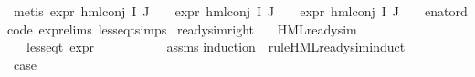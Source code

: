 \begin{isabellebody}
\ {\isacharparenleft}{\kern0pt}metis\ {\isacartoucheopen}expr{\isacharunderscore}{\kern0pt}{}\ {\isacharparenleft}{\kern0pt}hml{\isacharunderscore}{\kern0pt}conj\ I\ J\ {\isasymPhi}{\isacharparenright}{\kern0pt}\ {\isasymle}\ {}{\isacartoucheclose}\ {\isacartoucheopen}expr{\isacharunderscore}{\kern0pt}{}\ {\isacharparenleft}{\kern0pt}hml{\isacharunderscore}{\kern0pt}conj\ I\ J\ {\isasymPhi}{\isacharparenright}{\kern0pt}\ {\isasymle}\ {}{\isacartoucheclose}\ {\isacartoucheopen}expr{\isacharunderscore}{\kern0pt}{}\ {\isacharparenleft}{\kern0pt}hml{\isacharunderscore}{\kern0pt}conj\ I\ J\ {\isasymPhi}{\isacharparenright}{\kern0pt}\ {\isasymle}\ {}{\isacartoucheclose}\ enat{\isacharunderscore}{\kern0pt}ord{\isacharunderscore}{\kern0pt}code{\isacharparenleft}{\kern0pt}{}{\isacharparenright}{\kern0pt}\ expr{\isachardot}{\kern0pt}elims\ less{\isacharunderscore}{\kern0pt}eq{\isacharunderscore}{\kern0pt}t{\isachardot}{\kern0pt}simps{\isacharparenright}{\kern0pt}\isanewline
{}\isamarkupfalse%
%
\endisatagproof
{\isafoldproof}%
%
\isadelimproof
\isanewline
%
\endisadelimproof
\isanewline
{}\isamarkupfalse%
\ ready{\isacharunderscore}{\kern0pt}sim{\isacharunderscore}{\kern0pt}right{\isacharcolon}{\kern0pt}\isanewline
\ \ \ {\isachardoublequoteopen}HML{\isacharunderscore}{\kern0pt}ready{\isacharunderscore}{\kern0pt}sim\ {\isasymphi}{\isachardoublequoteclose}\isanewline
\ \ \ {\isachardoublequoteopen}less{\isacharunderscore}{\kern0pt}eq{\isacharunderscore}{\kern0pt}t\ {\isacharparenleft}{\kern0pt}expr\ {\isasymphi}{\isacharparenright}{\kern0pt}\ {\isacharparenleft}{\kern0pt}{\isasyminfinity}{\isacharcomma}{\kern0pt}\ {\isasyminfinity}{\isacharcomma}{\kern0pt}\ {\isasyminfinity}{\isacharcomma}{\kern0pt}\ {\isasyminfinity}{\isacharcomma}{\kern0pt}\ {}{\isacharcomma}{\kern0pt}\ {}{\isacharparenright}{\kern0pt}{\isachardoublequoteclose}\isanewline
%
\isadelimproof
\ \ %
\endisadelimproof
%
\isatagproof
{}\isamarkupfalse%
\ assms\isanewline
{}\isamarkupfalse%
{\isacharparenleft}{\kern0pt}induction\ {\isasymphi}\ rule{\isacharcolon}{\kern0pt}HML{\isacharunderscore}{\kern0pt}ready{\isacharunderscore}{\kern0pt}sim{\isachardot}{\kern0pt}induct{\isacharparenright}{\kern0pt}\isanewline
\ \ \isamarkupfalse%
\ {}\isanewline
\ \ \isamarkupfalse%
\ \isamarkupfalse%
\ {\isacharquery}{\kern0pt}case\ \isanewline
\ \ \ \ \isamarkupfalse%

\end{isabellebody}
